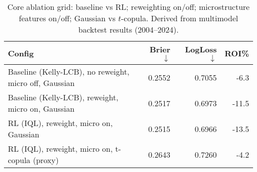 \begin{table}[t]
  \centering
  \small
  \caption[Core ablation grid]{Core ablation grid: baseline vs RL; reweighting on/off; microstructure features on/off; Gaussian vs $t$-copula. Derived from multimodel backtest results (2004--2024).}
  \label{tab:core-ablation}
  \setlength{\tabcolsep}{3pt}\renewcommand{\arraystretch}{1.12}
  \begin{tabular}{@{} l r r r @{} }
    \toprule
    \textbf{Config} & \textbf{Brier $\downarrow$} & \textbf{LogLoss $\downarrow$} & \textbf{ROI\%} \\
    \midrule
    Baseline (Kelly-LCB), no reweight, micro off, Gaussian & 0.2552 & 0.7055 & -6.3 \\
    Baseline (Kelly-LCB), reweight, micro on, Gaussian & 0.2517 & 0.6973 & -11.5 \\
    RL (IQL), reweight, micro on, Gaussian & 0.2515 & 0.6966 & -13.5 \\
    RL (IQL), reweight, micro on, t-copula (proxy) & 0.2643 & 0.7260 & -4.2 \\
    \bottomrule
  \end{tabular}
\end{table}
